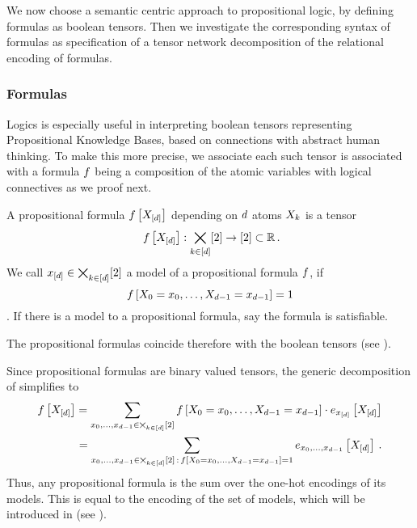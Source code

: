 We now choose a semantic centric approach to propositional logic, by defining formulas as boolean tensors.
Then we investigate the corresponding syntax of formulas as specification of a tensor network decomposition of the relational encoding of formulas.

\subsubsection{Formulas}

Logics is especially useful in interpreting boolean tensors representing Propositional Knowledge Bases, based on connections with abstract human thinking.
To make this more precise, we associate each such tensor is associated with a formula $f$ being a composition of the atomic variables with logical connectives as we proof next.

\begin{definition}\label{def:formulas}
	A propositional formula $f\left[X_{[d]}\right]$ depending on $d$ atoms $X_{k}$ is a tensor
		\[ \formulaat{\shortcatvariables} : \atomstates \rightarrow [2] \subset \rr \, . \]
	We call $x_{[d]} \in \bigtimes_{k\in[d]}[2]$ a model of a propositional formula $f$, if 
		\[ f\left[X_{0}=x_{0},\ldots,X_{d-1}=x_{d-1}\right]=1 \].
	If there is a model to a propositional formula, say the formula is satisfiable.
\end{definition}

The propositional formulas coincide therefore with the boolean tensors (see ).


Since propositional formulas are binary valued tensors, the generic decomposition of  simplifies to
\begin{align}\label{eq:formulaModelDecomposition}
	f\left[X_{[d]}\right] = \sum_{x_{0},\ldots,x_{d-1}\in\bigtimes_{k\in[d]}[2]} f\left[X_{0}=x_{0},\ldots,X_{d-1}=x_{d-1}\right] \cdot e_{x_{[d]}}\left[X_{[d]}\right] \\
	= \sum_{x_{0},\ldots,x_{d-1}\in\bigtimes_{k\in[d]}[2] \, : \, f\left[X_{0}=x_{0},\ldots,X_{d-1}=x_{d-1}\right]=1}  e_{x_{0},\ldots,x_{d-1}}\left[X_{[d]}\right] \, .
\end{align}
Thus, any propositional formula is the sum over the one-hot encodings of its models.
This is equal to the encoding of the set of models, which will be introduced in  (see ).

